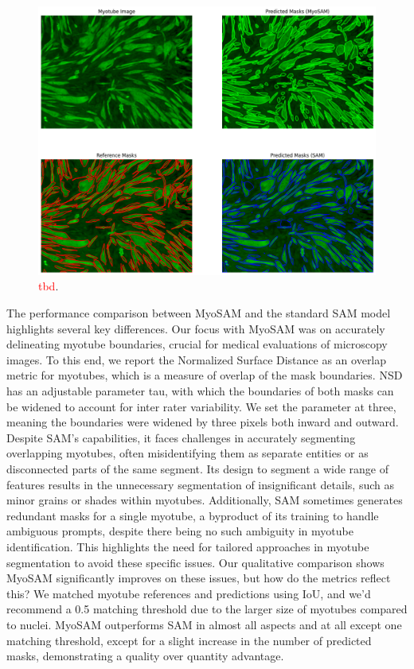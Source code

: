 \begin{figure}
	\centering
	\includegraphics[width=\textwidth]{"images/qualitative_performance_myosam.png"}
	\caption[Qualitative performance \texttt{MyoSAM}]{\textcolor{red}{tbd}.}
	\label{figperfsamqual}
\end{figure} 
The performance comparison between MyoSAM and the standard SAM model highlights several key differences. Our focus with MyoSAM was on accurately delineating myotube boundaries, crucial for medical evaluations of microscopy images. To this end, we report the Normalized Surface Distance as an overlap metric for myotubes, which is a measure of overlap of the mask boundaries. NSD has an adjustable parameter tau, with which the boundaries of both masks can be widened to account for inter rater variability. We set the parameter at three, meaning the boundaries were widened by three pixels both inward and outward.
Despite SAM's capabilities, it faces challenges in accurately segmenting overlapping myotubes, often misidentifying them as separate entities or as disconnected parts of the same segment. Its design to segment a wide range of features results in the unnecessary segmentation of insignificant details, such as minor grains or shades within myotubes. Additionally, SAM sometimes generates redundant masks for a single myotube, a byproduct of its training to handle ambiguous prompts, despite there being no such ambiguity in myotube identification. This highlights the need for tailored approaches in myotube segmentation to avoid these specific issues. Our qualitative comparison shows MyoSAM significantly improves on these issues, but how do the metrics reflect this? We matched myotube references and predictions using IoU, and we’d recommend a 0.5 matching threshold due to the larger size of myotubes compared to nuclei. MyoSAM outperforms SAM in almost all aspects and at all except one matching threshold, except for a slight increase in the number of predicted masks, demonstrating a quality over quantity advantage.

